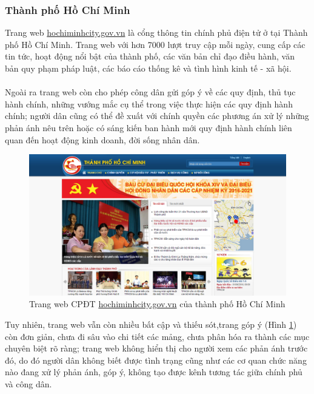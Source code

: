 \documentclass[a4paper]{article}
\begin{document}
\subsubsection{Thành phố Hồ Chí Minh}	
Trang web \href{hochiminhcity.gov.vn}{hochiminhcity.gov.vn} là cổng thông tin chính phủ điện tử ở tại Thành phố Hồ Chí Minh. Trang web với hơn 7000 lượt truy cập mỗi ngày, cung cấp các tin tức, hoạt động nổi bật của thành phố, các văn bản chỉ đạo điều hành, văn bản quy phạm pháp luật, các báo cáo thống kê và tình hình kinh tế - xã hội.\\
\\
Ngoài ra trang web còn cho phép công dân gửi góp ý về các quy định, thủ tục hành chính, những vướng mắc cụ thể trong việc thực hiện các quy định hành chính; người dân cũng có thể đề xuất với chính quyền các phương án xử lý những phản ánh nêu trên hoặc có sáng kiến ban hành mới quy định hành chính liên quan đến hoạt động kinh doanh, đời sống nhân dân.
\begin{center}
    \begin{figure}[h]
    \begin{center}
     \includegraphics[scale=.4]{egov-tphcm.PNG}
    \end{center}
    \caption{Trang web CPĐT \href{hochiminhcity.gov.vn}{hochiminhcity.gov.vn} của thành phố Hồ Chí Minh}
    \label{refhinh7}
    \end{figure}
\end{center}
Tuy nhiên, trang web vẫn còn nhiều bất cập và thiếu sót,trang góp ý (Hình \ref{refhinh7}) còn đơn giản, chưa đi sâu vào chi tiết các mảng, chưa phân hóa ra thành các mục chuyên biệt rõ ràng; trang web không hiển thị cho người xem các phản ánh trước đó, do đó người dân không biết được tình trạng cũng như các cơ quan chức năng nào đang xử lý phản ánh, góp ý, không tạo được kênh tương tác giữa chính phủ và công dân.
\end{document}
